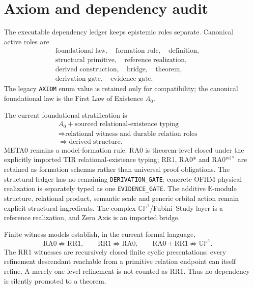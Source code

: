 \documentclass[11pt]{article}
\newcommand{\CP}{\mathbb{CP}^{1}}
\begin{document}
\section{Axiom and dependency audit}

The executable dependency ledger keeps epistemic roles separate. Canonical
active roles are
\[
\boxed{
\begin{gathered}
\text{foundational law},\quad
\text{formation rule},\quad
\text{definition},\\
\text{structural primitive},\quad
\text{reference realization},\\
\text{derived construction},\quad
\text{bridge},\quad
\text{theorem},\\
\text{derivation gate},\quad
\text{evidence gate}.
\end{gathered}
}
\]
The legacy \texttt{AXIOM} enum value is retained only for compatibility; the
canonical foundational law is the First Law of Existence \(A_0\).

The current foundational stratification is
\[
\boxed{
\begin{gathered}
A_0+\text{sourced relational-existence typing}\\
\Longrightarrow\text{relational witness and durable relation roles}\\
\Longrightarrow\text{derived structure}.
\end{gathered}
}
\]
META0 remains a model-formation rule. RA0 is theorem-level closed under the
explicitly imported TIR relational-existence typing; RR1, RA0* and
RA0\(^{\mathrm{rel}*}\) are retained as formation schemas rather than
universal proof obligations. The structural ledger has no remaining
\texttt{DERIVATION\_GATE}; concrete OFHM physical realization is separately
typed as one \texttt{EVIDENCE\_GATE}. The additive \(\mathbb K\)-module
structure, relational product, semantic scale and generic orbital action remain
explicit structural ingredients. The complex \(\CP\)/Fubini--Study layer is
a reference realization, and Zero Axis is an imported bridge.

Finite witness models establish, in the current formal language,
\[
\boxed{
\mathrm{RA0}\not\Rightarrow\mathrm{RR1},
\qquad
\mathrm{RR1}\not\Rightarrow\mathrm{RA0},
\qquad
\mathrm{RA0}+\mathrm{RR1}\not\Rightarrow\CP.
}
\]
The RR1 witnesses are recursively closed finite cyclic presentations: every
refinement descendant reachable from a primitive relation endpoint can itself
refine. A merely one-level refinement is not counted as RR1. Thus no
dependency is silently promoted to a theorem.
\end{document}
